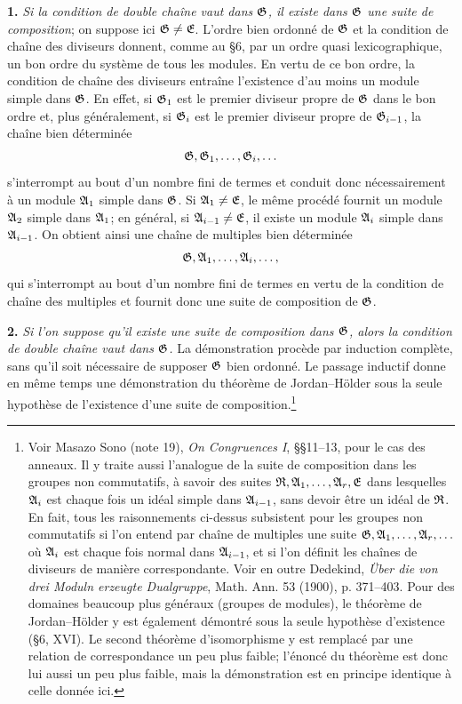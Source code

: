 \textbf{1.} \emph{Si la condition de double chaîne vaut dans $\mathfrak{G}$, il existe dans $\mathfrak{G}$ une suite de composition}; on suppose ici $\mathfrak{G}\ne\mathfrak{E}$. L'ordre bien ordonné de $\mathfrak{G}$ et la condition de chaîne des diviseurs donnent, comme au \S{}6, par un ordre quasi lexicographique, un bon ordre du système de tous les modules. En vertu de ce bon ordre, la condition de chaîne des diviseurs entraîne l'existence d'au moins un module simple dans $\mathfrak{G}$. En effet, si $\mathfrak{G}_1$ est le premier diviseur propre de $\mathfrak{G}$ dans le bon ordre et, plus généralement, si $\mathfrak{G}_i$ est le premier diviseur propre de $\mathfrak{G}_{i-1}$, la chaîne bien déterminée
\[
        \mathfrak{G},\mathfrak{G}_1,\ldots,\mathfrak{G}_i,\ldots
\]
s'interrompt au bout d'un nombre fini de termes et conduit donc nécessairement à un module $\mathfrak{A}_1$ simple dans $\mathfrak{G}$. Si $\mathfrak{A}_1\ne\mathfrak{E}$, le même procédé fournit un module $\mathfrak{A}_2$ simple dans $\mathfrak{A}_1$; en général, si $\mathfrak{A}_{i-1}\ne\mathfrak{E}$, il existe un module $\mathfrak{A}_i$ simple dans $\mathfrak{A}_{i-1}$. On obtient ainsi une chaîne de multiples bien déterminée
\[
        \mathfrak{G},\mathfrak{A}_1,\ldots,\mathfrak{A}_i,\ldots,
\]
qui s'interrompt au bout d'un nombre fini de termes en vertu de la condition de chaîne des multiples et fournit donc une suite de composition de $\mathfrak{G}$.

\textbf{2.} \emph{Si l'on suppose qu'il existe une suite de composition dans $\mathfrak{G}$, alors la condition de double chaîne vaut dans $\mathfrak{G}$.} La démonstration procède par induction complète, sans qu'il soit nécessaire de supposer $\mathfrak{G}$ bien ordonné. Le passage inductif donne en même temps une démonstration du théorème de Jordan--Hölder sous la seule hypothèse de l'existence d'une suite de composition.\footnote{Voir Masazo Sono (note 19), \emph{On Congruences I}, \S{}\S{}11--13, pour le cas des anneaux. Il y traite aussi l'analogue de la suite de composition dans les groupes non commutatifs, à savoir des suites $\mathfrak{R},\mathfrak{A}_1,\ldots,\mathfrak{A}_r,\mathfrak{E}$ dans lesquelles $\mathfrak{A}_i$ est chaque fois un idéal simple dans $\mathfrak{A}_{i-1}$, sans devoir être un idéal de $\mathfrak{R}$. En fait, tous les raisonnements ci-dessus subsistent pour les groupes non commutatifs si l'on entend par chaîne de multiples une suite $\mathfrak{G},\mathfrak{A}_1,\ldots,\mathfrak{A}_r,\ldots$ où $\mathfrak{A}_i$ est chaque fois normal dans $\mathfrak{A}_{i-1}$, et si l'on définit les chaînes de diviseurs de manière correspondante. Voir en outre Dedekind, \emph{Über die von drei Moduln erzeugte Dualgruppe}, Math. Ann. 53 (1900), p. 371--403. Pour des domaines beaucoup plus généraux (groupes de modules), le théorème de Jordan--Hölder y est également démontré sous la seule hypothèse d'existence (\S{}6, XVI). Le second théorème d'isomorphisme y est remplacé par une relation de correspondance un peu plus faible; l'énoncé du théorème est donc lui aussi un peu plus faible, mais la démonstration est en principe identique à celle donnée ici.}

